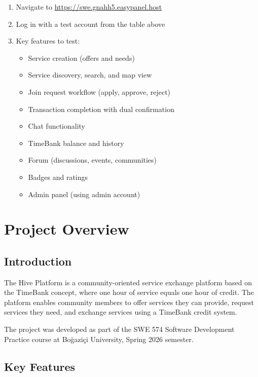 \documentclass[10pt,a4paper]{report}
\begin{document}
\begin{enumerate}
    \item Navigate to \url{https://swe.gnahh5.easypanel.host}
    \item Log in with a test account from the table above
    \item Key features to test:
          \begin{itemize}
              \item Service creation (offers and needs)
              \item Service discovery, search, and map view
              \item Join request workflow (apply, approve, reject)
              \item Transaction completion with dual confirmation
              \item Chat functionality
              \item TimeBank balance and history
              \item Forum (discussions, events, communities)
              \item Badges and ratings
              \item Admin panel (using admin account)
          \end{itemize}
\end{enumerate}

\chapter{Project Overview}

\section{Introduction}

The Hive Platform is a community-oriented service exchange platform based on the TimeBank concept, where one hour of service equals one hour of credit. The platform enables community members to offer services they can provide, request services they need, and exchange services using a TimeBank credit system.

The project was developed as part of the SWE 574 Software Development Practice course at Bo\u{g}azi\c{c}i University, Spring 2026 semester.

\section{Key Features}
\end{document}
